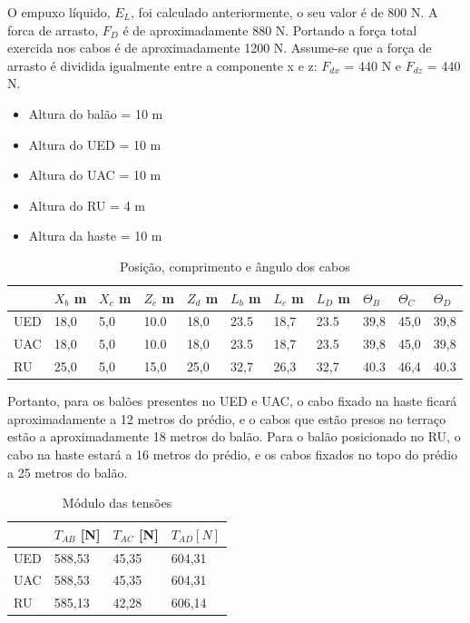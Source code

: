 	O empuxo líquido, $E_{L}$, foi calculado anteriormente, o seu valor é de 800 N. A forca de arrasto, $F_{D}$ é de aproximadamente 880 N. Portando a força total exercida nos cabos é de aproximadamente 1200 N. Assume-se que a força de arrasto é dividida igualmente entre a componente x e z: $F_{dx}$ = 440 N e $F_{dz}$ = 440 N.

	\begin{itemize}
		\item Altura do balão = 10 m
 		\item Altura do UED = 10 m
 		\item Altura do UAC = 10 m
 		\item Altura do RU = 4 m
 		\item Altura da haste = 10 m
	\end{itemize}

\begin{table}[H]
\centering
\begin{tabular}{l|l|l|l|l|l|l|l|l|l|l|}
\cline{2-11}
 & $X_{b}$ m & $X_{c}$ m & $Z_{c}$ m & $Z_{d}$ m & $L_{b}$ m & $L_{c}$ m & $L_{D}$ m & $\Theta _{B}$ & $\Theta _{C}$ & $\Theta _{D}$ \\ \hline
\multicolumn{1}{|l|}{UED} & 18,0 & 5,0 & 10.0 & 18,0 & 23.5 & 18,7 & 23.5 & 39,8 & 45,0 & 39,8 \\ \hline
\multicolumn{1}{|l|}{UAC} & 18,0 & 5,0 & 10.0 & 18,0 & 23.5 & 18,7 & 23.5 & 39,8 & 45,0 & 39,8 \\ \hline
\multicolumn{1}{|l|}{RU} & 25,0 & 5,0 & 15,0 & 25,0 & 32,7 & 26,3 & 32,7 & 40.3 & 46,4 & 40.3 \\ \hline
\end{tabular}
\caption{Posição, comprimento e ângulo dos cabos}
\label{tab:composangcabos}
\end{table}

Portanto, para os balões presentes no UED e UAC, o cabo fixado na haste ficará aproximadamente a 12 metros do prédio, e o cabos que estão presos no terraço estão a aproximadamente 18 metros do balão. Para o balão posicionado no RU, o cabo na haste estará a 16 metros do prédio, e os cabos fixados no topo do prédio a 25 metros do balão.

\begin{table}[H]
\centering
\begin{tabular}{l|l|l|l|}
\cline{2-4}
 & $T_{AB}$ [N] & $T_{AC}$ [N] & $T_{AD} [N]$ \\ \hline
\multicolumn{1}{|l|}{UED} & 588,53 & 45,35 & 604,31 \\ \hline
\multicolumn{1}{|l|}{UAC} & 588,53 & 45,35 & 604,31 \\ \hline
\multicolumn{1}{|l|}{RU} & 585,13 & 42,28 & 606,14 \\ \hline
\end{tabular}
\caption{ Módulo das tensões}
\label{table:modTensoes}
\end{table}

